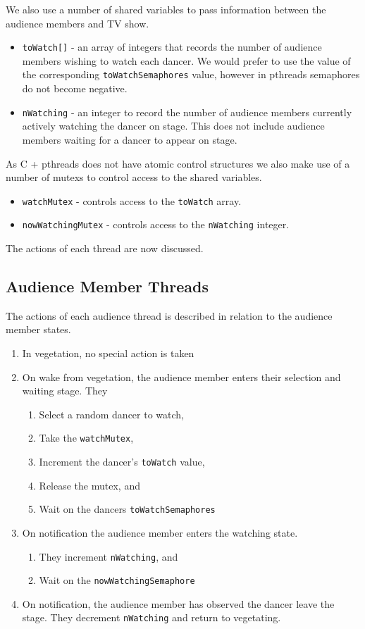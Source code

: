 \documentclass[12pt,a4paper]{scrartcl}
\begin{document}
We also use a number of shared variables to pass information between the audience members and TV show.
\begin{itemize}
    \item \texttt{toWatch[]} - an array of integers that records the number of audience members wishing to watch each dancer.
          We would prefer to use the value of the corresponding \texttt{toWatchSemaphores} value, however in pthreads semaphores do not become negative.
    \item \texttt{nWatching} - an integer to record the number of audience members currently actively watching the dancer on stage.
          This does not include audience members waiting for a dancer to appear on stage.
\end{itemize}

As C + pthreads does not have atomic control structures we also make use of a number of mutexs to control access to the shared variables.
\begin{itemize}
    \item \texttt{watchMutex} - controls access to the \texttt{toWatch} array.
    \item \texttt{nowWatchingMutex} - controls access to the \texttt{nWatching} integer.
\end{itemize}

The actions of each thread are now discussed.

\subsection{Audience Member Threads}
The actions of each audience thread is described in relation to the audience member states.
\begin{enumerate}
    \item In vegetation, no special action is taken
    \item On wake from vegetation, the audience member enters their selection and waiting stage. They
    \begin{enumerate}
        \item Select a random dancer to watch,
        \item Take the \texttt{watchMutex},
        \item Increment the dancer's \texttt{toWatch} value,
        \item Release the mutex, and
        \item Wait on the dancers \texttt{toWatchSemaphores}
    \end{enumerate}
    \item On notification the audience member enters the watching state.
    \begin{enumerate}
        \item They increment \texttt{nWatching}, and
        \item Wait on the \texttt{nowWatchingSemaphore}
    \end{enumerate}
    \item On notification, the audience member has observed the dancer leave the stage. They decrement \texttt{nWatching} and return to vegetating.
\end{enumerate}
\end{document}
